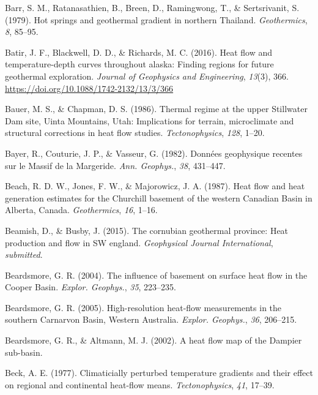 \begin{CSLReferences}{1}{1}
\leavevmode{}%
Barr, S. M., Ratanasathien, B., Breen, D., Ramingwong, T., \& Sertsrivanit, S. (1979). Hot springs and geothermal gradient in northern {Thailand}. \emph{Geothermics}, \emph{8}, 85--95.

\leavevmode{}%
Batir, J. F., Blackwell, D. D., \& Richards, M. C. (2016). Heat flow and temperature-depth curves throughout alaska: Finding regions for future geothermal exploration. \emph{Journal of Geophysics and Engineering}, \emph{13}(3), 366. \url{https://doi.org/10.1088/1742-2132/13/3/366}

\leavevmode{}%
Bauer, M. S., \& Chapman, D. S. (1986). Thermal regime at the upper {Stillwater Dam} site, {Uinta Mountains, Utah}: Implications for terrain, microclimate and structural corrections in heat flow studies. \emph{Tectonophysics}, \emph{128}, 1--20.

\leavevmode{}%
Bayer, R., Couturie, J. P., \& Vasseur, G. (1982). Données geophysique recentes sur le {Massif de la Margeride}. \emph{Ann. Geophys.}, \emph{38}, 431--447.

\leavevmode{}%
Beach, R. D. W., Jones, F. W., \& Majorowicz, J. A. (1987). Heat flow and heat generation estimates for the {Churchill} basement of the western {Canadian Basin} in {Alberta, Canada}. \emph{Geothermics}, \emph{16}, 1--16.

\leavevmode{}%
Beamish, D., \& Busby, J. (2015). The cornubian geothermal province: Heat production and flow in SW england. \emph{Geophysical Journal International}, \emph{submitted}.

\leavevmode{}%
Beardsmore, G. R. (2004). The influence of basement on surface heat flow in the {Cooper Basin}. \emph{Explor. Geophys.}, \emph{35}, 223--235.

\leavevmode{}%
Beardsmore, G. R. (2005). High-resolution heat-flow measurements in the southern {Carnarvon Basin, Western Australia}. \emph{Explor. Geophys.}, \emph{36}, 206--215.

\leavevmode{}%
Beardsmore, G. R., \& Altmann, M. J. (2002). A heat flow map of the {Dampier} sub-basin.

\leavevmode{}%
Beck, A. E. (1977). Climaticially perturbed temperature gradients and their effect on regional and continental heat-flow means. \emph{Tectonophysics}, \emph{41}, 17--39.


\end{CSLReferences}
